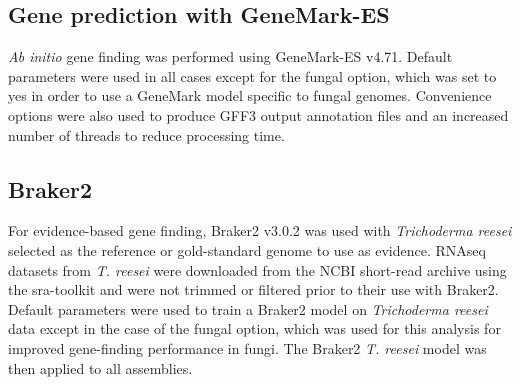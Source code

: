 \subsection{Gene prediction with GeneMark-ES}

\textit{Ab initio} gene finding was performed using GeneMark-ES
v4.71. Default parameters were used in all cases except for the fungal
option, which was set to yes in order to use a GeneMark model specific
to fungal genomes. Convenience options were also used to produce GFF3
output annotation files and an increased number of threads to reduce
processing time.

%

\subsection{Braker2}

For evidence-based gene finding, Braker2 v3.0.2 was used with
\textit{Trichoderma reesei} selected as the reference or gold-standard
genome to use as evidence. RNAseq datasets from \textit{T. reesei}
were downloaded from the NCBI short-read archive using the sra-toolkit
and were not trimmed or filtered prior to their use with
Braker2. Default parameters were used to train a Braker2 model on
\textit{Trichoderma reesei} data except in the case of the fungal
option, which was used for this analysis for improved gene-finding
performance in fungi. The Braker2 \textit{T. reesei} model was then
applied to all assemblies.


